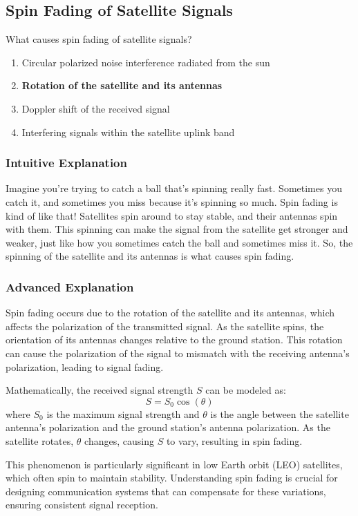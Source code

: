 \subsection{Spin Fading of Satellite Signals}
\label{T8B09}

\begin{tcolorbox}[colback=gray!10!white,colframe=black!75!black,title=T8B09]
What causes spin fading of satellite signals?
\begin{enumerate}[label=\Alph*)]
    \item Circular polarized noise interference radiated from the sun
    \item \textbf{Rotation of the satellite and its antennas}
    \item Doppler shift of the received signal
    \item Interfering signals within the satellite uplink band
\end{enumerate}
\end{tcolorbox}

\subsubsection{Intuitive Explanation}
Imagine you're trying to catch a ball that’s spinning really fast. Sometimes you catch it, and sometimes you miss because it’s spinning so much. Spin fading is kind of like that! Satellites spin around to stay stable, and their antennas spin with them. This spinning can make the signal from the satellite get stronger and weaker, just like how you sometimes catch the ball and sometimes miss it. So, the spinning of the satellite and its antennas is what causes spin fading.

\subsubsection{Advanced Explanation}
Spin fading occurs due to the rotation of the satellite and its antennas, which affects the polarization of the transmitted signal. As the satellite spins, the orientation of its antennas changes relative to the ground station. This rotation can cause the polarization of the signal to mismatch with the receiving antenna's polarization, leading to signal fading. 

Mathematically, the received signal strength \( S \) can be modeled as:
\[ S = S_0 \cos(\theta) \]
where \( S_0 \) is the maximum signal strength and \( \theta \) is the angle between the satellite antenna's polarization and the ground station's antenna polarization. As the satellite rotates, \( \theta \) changes, causing \( S \) to vary, resulting in spin fading.

This phenomenon is particularly significant in low Earth orbit (LEO) satellites, which often spin to maintain stability. Understanding spin fading is crucial for designing communication systems that can compensate for these variations, ensuring consistent signal reception.

